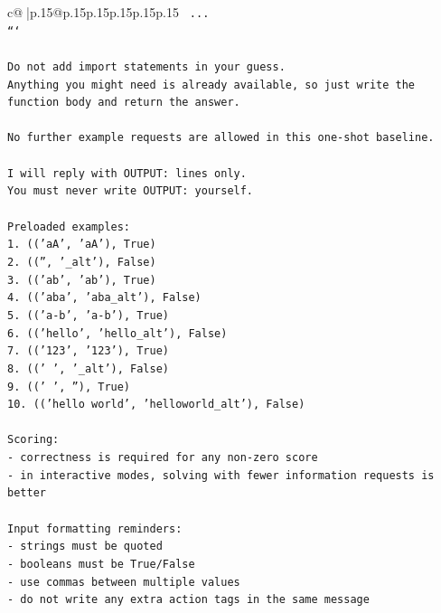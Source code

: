 \documentclass{article}
\begin{document}
{\begin{supertabular}{c@{$\;$}|p{.15\linewidth}@{}p{.15\linewidth}p{.15\linewidth}p{.15\linewidth}p{.15\linewidth}p{.15\linewidth}}
{{{\texttt{    ...} \\
\texttt{```} \\
\\ 
\texttt{Do not add import statements in your guess.} \\
\texttt{Anything you might need is already available, so just write the function body and return the answer.} \\
\\ 
\texttt{No further example requests are allowed in this one{-}shot baseline.} \\
\\ 
\texttt{I will reply with OUTPUT: lines only.} \\
\texttt{You must never write OUTPUT: yourself.} \\
\\ 
\texttt{Preloaded examples:} \\
\texttt{1. (('aA', 'aA'), True)} \\
\texttt{2. (('', '\_alt'), False)} \\
\texttt{3. (('ab', 'ab'), True)} \\
\texttt{4. (('aba', 'aba\_alt'), False)} \\
\texttt{5. (('a{-}b', 'a{-}b'), True)} \\
\texttt{6. (('hello', 'hello\_alt'), False)} \\
\texttt{7. (('123', '123'), True)} \\
\texttt{8. ((' ', '\_alt'), False)} \\
\texttt{9. (('   ', ''), True)} \\
\texttt{10. (('hello world', 'helloworld\_alt'), False)} \\
\\ 
\texttt{Scoring:} \\
\texttt{{-} correctness is required for any non{-}zero score} \\
\texttt{{-} in interactive modes, solving with fewer information requests is better} \\
\\ 
\texttt{Input formatting reminders:} \\
\texttt{{-} strings must be quoted} \\
\texttt{{-} booleans must be True/False} \\
\texttt{{-} use commas between multiple values} \\
\texttt{{-} do not write any extra action tags in the same message} \\
\\ 
}}}
\end{supertabular}}
\end{document}
